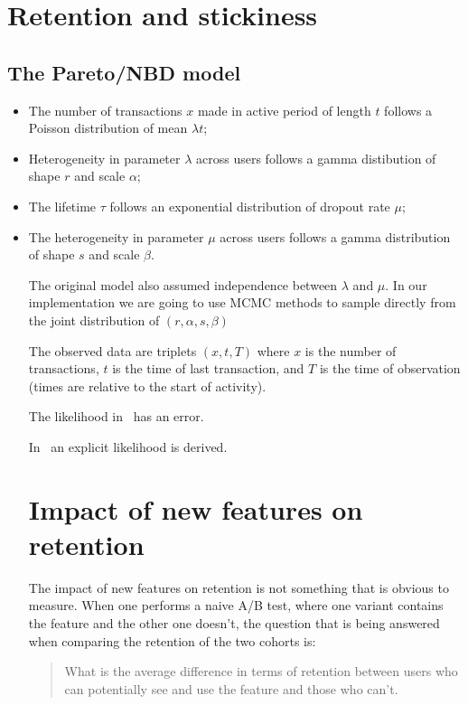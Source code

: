 \documentclass{tufte-book}
\begin{document}
\section{Retention and stickiness}
\label{sec:retention_and_stickiness}

\subsection{The Pareto/NBD model}
\label{sub:the_pareto_nbd_model}

\begin{itemize}
\item The number of transactions $x$ made in active period of length
  $t$ follows a Poisson distribution of mean $\lambda t$;
\item Heterogeneity in parameter $\lambda$ across users follows a
  gamma distibution of shape $r$ and scale $\alpha$;
\item The lifetime $\tau$ follows an exponential distribution of
  dropout rate $\mu$;
\item The heterogeneity in parameter $\mu$ across users follows a
  gamma distribution of shape $s$ and scale $\beta$.

The original model also assumed independence between $\lambda$ and
$\mu$. In our implementation we are going to use MCMC methods to
sample directly from the joint distribution of $(r,\alpha,s,\beta)$

The observed data are triplets $(x,t,T)$ where $x$ is the number of
transactions, $t$ is the time of last transaction, and $T$ is the time
of observation (times are relative to the start of activity).

The likelihood in~\cite{Fader2005} has an error.

In~\cite{Schmittlein1987} an explicit likelihood is derived.



  
  \section{Impact of new features on retention}

The impact of new features on retention is not something that is obvious to
measure. When one performs a naive A/B test, where one variant contains the
feature and the other one doesn't, the question that is being answered when
comparing the retention of the two cohorts is:

\begin{quotation}
	What is the average difference in terms of retention between users who
	can potentially see and use the feature and those who can't.
\end{quotation}


\end{itemize}
\end{document}
